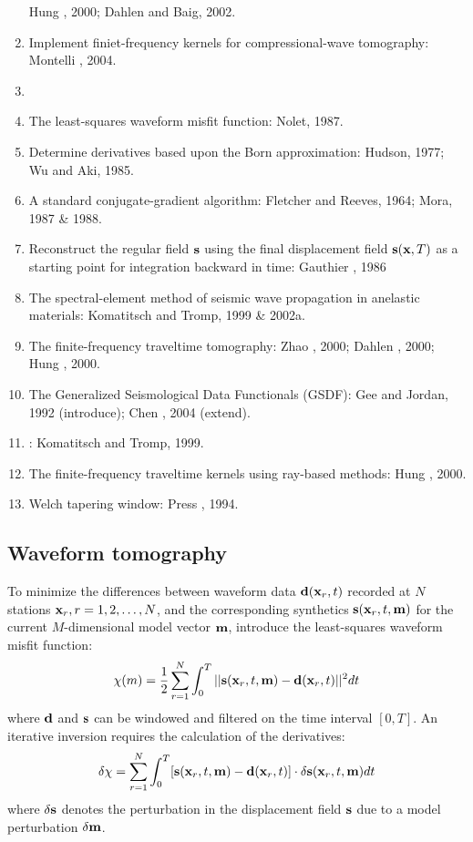 \begin{enumerate}[\hspace{10mm}*]
    Hung \etal, 2000; Dahlen and Baig, 2002.
  \item Implement finiet-frequency kernels for compressional-wave tomography: Montelli \etal, 2004.
  \item \sline
  \item The least-squares waveform misfit function: Nolet, 1987.
  \item Determine \Frechet derivatives based upon the Born approximation:
    Hudson, 1977; Wu and Aki, 1985.
  \item A standard conjugate-gradient algorithm: Fletcher and Reeves, 1964; Mora, 1987 \& 1988.
  \item Reconstruct the regular field $\mathbf{s}$ using the final displacement field $\mathbf{s}(\mathbf{x},T)$
    as a starting point for integration backward in time: Gauthier \etal, 1986
  \item The spectral-element method of seismic wave propagation in anelastic materials:
    Komatitsch and Tromp, 1999 \& 2002a.
  \item The finite-frequency traveltime tomography:
    Zhao \etal, 2000; Dahlen \etal, 2000; Hung \etal, 2000.
  \item The Generalized Seismological Data Functionals (GSDF):
    Gee and Jordan, 1992 (introduce); Chen \etal, 2004 (extend).
  \item {}: Komatitsch and Tromp, 1999.
  \item The finite-frequency traveltime kernels using ray-based methods: Hung \etal, 2000.
  \item Welch tapering window: Press \etal, 1994.
\end{enumerate}

\subsection{Waveform tomography}
To minimize the differences between waveform data $\mathbf{d}(\mathbf{x}_r,t)$
recorded at $N$ stations $\mathbf{x}_r,r=1,2,\ldots,N$,
and the corresponding synthetics $\mathbf{s}(\mathbf{x}_r,t,\mathbf{m})$
for the current $M$-dimensional model vector $\mathbf{m}$,
introduce the least-squares waveform misfit function:
\[ \chi(m)=\frac{1}{2}\sum_{r=1}^N\int_0^T||\mathbf{s}(\mathbf{x}_r,t,\mathbf{m})-\mathbf{d}(\mathbf{x}_r,t)||^2dt \]
where $\mathbf{d}$ and $\mathbf{s}$ can be windowed and filtered on the time interval $[0,T]$.
An iterative inversion requires the calculation of the \Frechet derivatives:
\[ \delta\chi=\sum_{r=1}^N\int_0^T[\mathbf{s}(\mathbf{x}_r,t,\mathbf{m})-\mathbf{d}(\mathbf{x}_r,t)]\cdot\delta\mathbf{s}(\mathbf{x}_r,t,\mathbf{m})dt \]
where $\delta\mathbf{s}$ denotes the perturbation in the displacement field $\mathbf{s}$
due to a model perturbation $\delta\mathbf{m}$.


